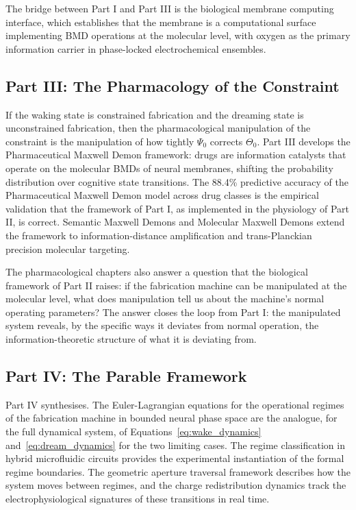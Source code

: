 The bridge between Part I and Part III is the biological membrane computing interface, which establishes that the membrane is a computational surface implementing BMD operations at the molecular level, with oxygen as the primary information carrier in phase-locked electrochemical ensembles.

\subsection{Part III: The Pharmacology of the Constraint}

If the waking state is constrained fabrication and the dreaming state is unconstrained fabrication, then the pharmacological manipulation of the constraint is the manipulation of how tightly $\Psi_0$ corrects $\Theta_0$. Part III develops the Pharmaceutical Maxwell Demon framework: drugs are information catalysts that operate on the molecular BMDs of neural membranes, shifting the probability distribution over cognitive state transitions. The 88.4\% predictive accuracy of the Pharmaceutical Maxwell Demon model across drug classes is the empirical validation that the framework of Part I, as implemented in the physiology of Part II, is correct. Semantic Maxwell Demons and Molecular Maxwell Demons extend the framework to information-distance amplification and trans-Planckian precision molecular targeting.

The pharmacological chapters also answer a question that the biological framework of Part II raises: if the fabrication machine can be manipulated at the molecular level, what does manipulation tell us about the machine's normal operating parameters? The answer closes the loop from Part I: the manipulated system reveals, by the specific ways it deviates from normal operation, the information-theoretic structure of what it is deviating from.

\subsection{Part IV: The Parable Framework}

Part IV synthesises. The Euler-Lagrangian equations for the operational regimes of the fabrication machine in bounded neural phase space are the analogue, for the full dynamical system, of Equations~\eqref{eq:wake_dynamics} and~\eqref{eq:dream_dynamics} for the two limiting cases. The regime classification in hybrid microfluidic circuits provides the experimental instantiation of the formal regime boundaries. The geometric aperture traversal framework describes how the system moves between regimes, and the charge redistribution dynamics track the electrophysiological signatures of these transitions in real time.

